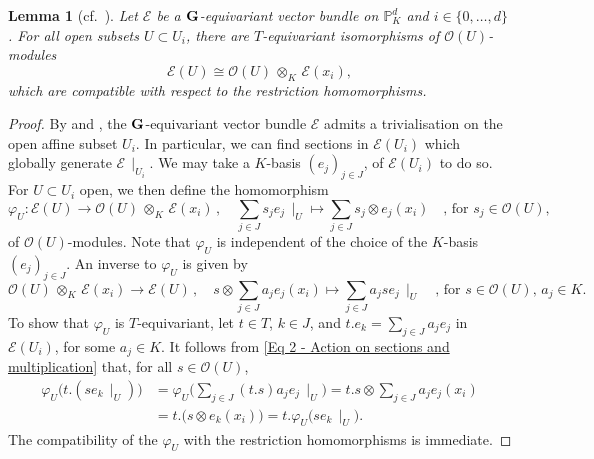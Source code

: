 \documentclass[a4paper, reqno, 10pt]{amsart}
\newtheorem{lemma}[theorem]{Lemma}
\theoremstyle{definition}
\numberwithin{equation}{section}
\newcommand{\botimes}[1]{{\,\otimes_{#1}\,}}
\newcommand{\lra}{\longrightarrow}
\newcommand{\lto}{\longmapsto}
\newcommand{\res}[1]{{\!\,\mid_{#1}}}
\newcommand{\BP}{{\mathbb {P}}}
\newcommand{\CE}{{\mathcal {E}}}
\newcommand{\CO}{{\mathcal {O}}}
\newcommand{\bG}{{\mathrm{\bf G}}}
\begin{document}
\begin{lemma}[{cf.\ \cite[Lemma 4.6]{Kempf78GrothendieckCousinComplexIndRep}}]\label{Lemma 2 - T-equivariant trivialization}
	Let $\CE$ be a $\bG$-equivariant vector bundle on $\BP_K^d$ and $i \in \{0,\ldots,d\}$.	
	For all open subsets $U\subset U_i$, there are $T$-equivariant isomorphisms of $\CO(U)$-modules
	\begin{equation*}
		\CE(U) \cong \CO(U) \botimes{K} \CE(x_i) ,
	\end{equation*}
	which are compatible with respect to the restriction homomorphisms.
\end{lemma}
\begin{proof}
	By \cite[I.5.16]{Jantzen03RepAlgGrp} and \cite[II.1.10]{Jantzen03RepAlgGrp}, the $\bG$-equivariant vector bundle $\CE$ admits a trivialisation on the open affine subset $U_i$.
	In particular, we can find sections in $\CE(U_i)$ which globally generate $\CE\res{U_i}$.
	We may take a $K$-basis $(e_j)_{j \in J}$, of $\CE(U_i)$  to do so.
	For $U\subset U_i$ open, we then define the homomorphism
	\begin{equation*}
		\varphi_U \colon \CE(U) \lra \CO(U) \botimes{K} \CE(x_i) \,,\quad \sum_{j\in J} s_j e_j\res{U} \lto \sum_{j\in J} s_j \otimes e_j(x_i) \quad\text{, for $s_j\in \CO(U)$,}
	\end{equation*}
	of $\CO(U)$-modules.
	Note that $\varphi_U$ is independent of the choice of the $K$-basis $(e_j)_{j \in J}$.
	An inverse to $\varphi_U$ is given by 
	\begin{equation*}
		\CO(U) \botimes{K} \CE(x_i) \lra \CE(U) \,,\quad s \otimes \sum_{j\in J} a_j e_j(x_i) \lto \sum_{j\in J} a_j s e_j\res{U} \quad\text{, for $s\in \CO(U)$, $a_j\in K$.}
	\end{equation*}
	To show that $\varphi_U$ is $T$-equivariant, let $t \in T$, $k\in J$, and $ t.e_k = \sum_{j \in J} a_j e_j$ in $\CE(U_i)$, for some $a_j\in K$.
	It follows from \eqref{Eq 2 - Action on sections and multiplication} that, for all $s \in \CO(U)$,
	\begin{align*}
		\varphi_U \big( t. (s e_k\res{U})\big)
		&= \varphi_U \bigg( \sum_{j\in J} (t.s) a_j e_j\res{U} \bigg) 
		=  t.s \otimes \sum_{j\in J} a_j e_j(x_i) \\
		&= t. \big( s \otimes e_k(x_i) \big) 
		= t. \varphi_U\big(s e_k\res{U}\big) .
	\end{align*}
	The compatibility of the $\varphi_U$ with the restriction homomorphisms is immediate.
\end{proof}
\end{document}
